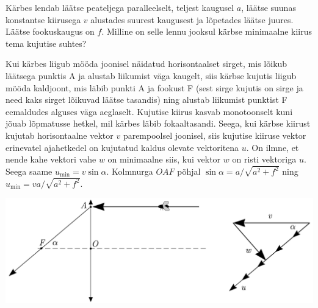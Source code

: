 \setAuthor{}

Kärbes lendab läätse peateljega paralleelselt, teljest kaugusel $a$, läätse suunas konstantse kiirusega $v$ alustades suurest kaugusest ja lõpetades läätse juures. Läätse fookuskaugus on $f$. Milline on selle lennu jooksul kärbse minimaalne kiirus tema kujutise suhtes? 

\hint

\solu
Kui kärbes liigub mööda joonisel näidatud horisontaalset sirget, mis lõikub läätsega punktis A ja alustab liikumist väga kaugelt, siis kärbse kujutis liigub mööda kaldjoont, mis läbib punkti A ja fookust F (sest sirge kujutis on sirge ja need kaks sirget lõikuvad läätse tasandis) ning alustab liikumist punktist F eemaldudes alguses väga aeglaselt. Kujutise kiirus kasvab monotoonselt kuni jõuab lõpmatusse hetkel, mil kärbes läbib fokaaltasandi. Seega, kui kärbse kiirust kujutab horisontaalne vektor $v$ parempoolsel joonisel, siis kujutise kiiruse vektor erinevatel ajahetkedel on kujutatud kaldus olevate vektoritena $u$. On ilmne, et nende kahe vektori vahe $w$ on minimaalne siis, kui vektor $w$ on risti vektoriga $u$. Seega saame $u_{\min}=v\sin\alpha$. Kolmnurga $OAF$ põhjal $\sin\alpha=a/\sqrt{a^2+f^2}$ ning $u_{\min}=va/\sqrt{a^2+f^2}$.\\

\begin{center}
\includegraphics[scale=0.7]{2019-v3g-08-sol.pdf}
\end{center}
\probend